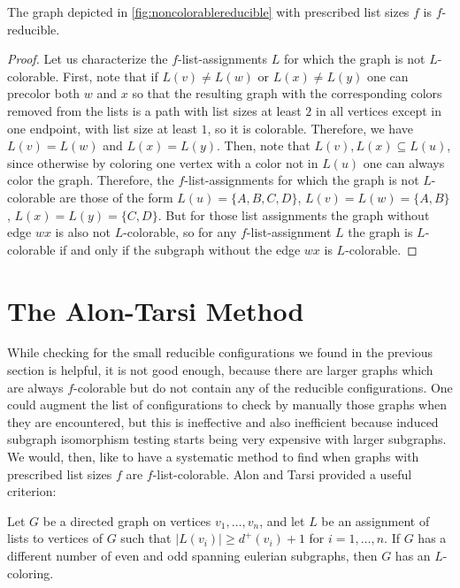 \begin{observation}
The graph depicted in \ref{fig:noncolorablereducible} with prescribed list sizes $f$ is $f$-reducible.
\end{observation}

\begin{proof}
Let us characterize the $f$-list-assignments $L$ for which the graph is not $L$-colorable. First, note that if $L(v) \neq L(w)$ or $L(x) \neq L(y)$
one can precolor both $w$ and $x$ so that the resulting graph with the corresponding colors removed from the lists is a path with list sizes at least $2$
in all vertices except in one endpoint, with list size at least $1$, so it is colorable. Therefore, we have $L(v) = L(w)$ and $L(x) = L(y)$. Then, note
that $L(v), L(x) \subseteq L(u)$, since otherwise by coloring one vertex with a color not in $L(u)$ one can always color the graph. Therefore, the $f$-list-assignments
for which the graph is not $L$-colorable are those of the form $L(u) = \{A, B, C, D\}$, $L(v) = L(w) = \{A, B\}$, $L(x) = L(y) = \{C, D\}$. But for those list assignments
the graph without edge $wx$ is also not $L$-colorable, so for any $f$-list-assignment $L$ the graph is $L$-colorable if and only if the subgraph without the edge $wx$ is
$L$-colorable.
\end{proof}

\section{The Alon-Tarsi Method}

While checking for the small reducible configurations we found in the previous section is helpful, it is not good enough, because
there are larger graphs which are always $f$-colorable but do not contain any of the reducible configurations. One could augment the
list of configurations to check by manually those graphs when they are encountered, but this is ineffective and also inefficient because
induced subgraph isomorphism testing starts being very expensive with larger subgraphs. 
We would, then, like to have a systematic method to find when graphs with prescribed list sizes $f$ are $f$-list-colorable. Alon and Tarsi
provided a useful criterion:

\begin{theorem}
\label{alontarsitheorem}
Let $G$ be a directed graph on vertices $v_1, \ldots, v_n$, and let $L$ be an assignment of lists to vertices of $G$ such that 
$|L(v_i)| \geq d^+(v_i)+1$ for $i = 1, \ldots, n$. If $G$ has a different number of even and odd spanning eulerian subgraphs,
then $G$ has an $L$-coloring.
\end{theorem}

